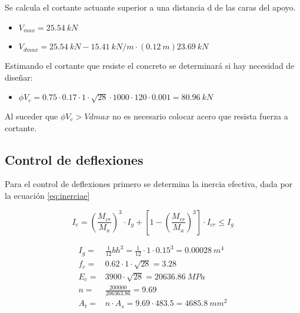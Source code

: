 \documentclass[12pt]{article}
\begin{document}
Se calcula el cortante actuante superior a una distancia d de las caras del apoyo.

\begin{itemize}
    
    \item $V_{max}=25.54 ~kN$
    
    \item $V_{dmax}=25.54~kN-15.41~kN/m\cdot(0.12~m)23.69~kN$
    
\end{itemize}

Estimando el cortante que resiste el concreto se determinará si hay necesidad de diseñar:

\begin{itemize}
    \item $\phi V_{c}=0.75\cdot  0.17\cdot 1\cdot \sqrt{28}\cdot 1000 \cdot 120\cdot 0.001=80.96~kN$
\end{itemize}

Al suceder que $\phi V_{c} > Vdmax$ no es necesario colocar acero que resista fuerza a cortante.

\subsection*{Control de deflexiones}
 Para el control de deflexiones primero se determina la inercia efectiva, dada por la ecuación \ref{eq:inerciae}
 
 \begin{equation}
     I_{e}=\left(\frac{M_{cr}}{M_{a}}\right)^3 \cdot I_{g} + \left[1- \left(\frac{M_{cr}}{M_{a}}\right)^3\right]\cdot I_{cr} \leq I_{g}
      \label{eq:inerciae}
 \end{equation}
 
 
\begin{align*}
I_{g}= &\frac{1}{12}bh^3=\frac{1}{12}\cdot 1 \cdot 0.15^3 = 0.00028~m^4\\
f_{r}=&  0.62\cdot 1 \cdot \sqrt{28} = 3.28\\  
E_{c}=& 3900\cdot \sqrt{28}=20636.86~MPa\\
n=& \frac{200000}{206363.86}=9.69\\
A_{t}=& n\cdot A_{s}=9.69 \cdot 483.5 = 4685.8~mm^2\\
\end{align*}
\end{document}
